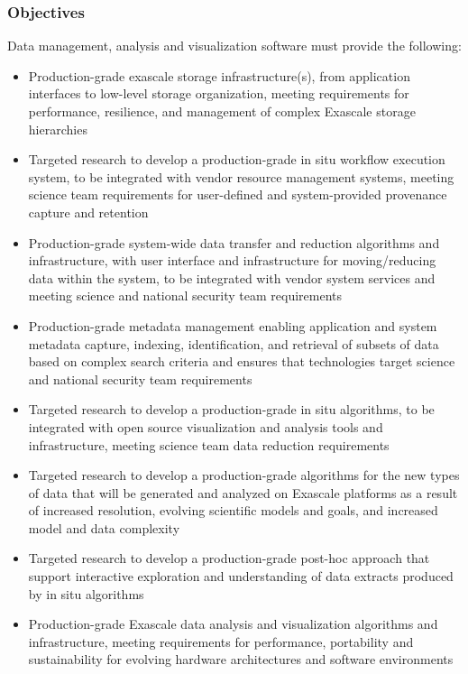 \subsubsection{Objectives}
Data management, analysis and visualization software must provide the following:
\begin{itemize}
\item Production-grade exascale storage infrastructure(s), from application interfaces to low-level storage organization, meeting requirements for performance, resilience, and management of complex Exascale storage hierarchies
\item Targeted research to develop a production-grade in situ workflow execution system, to be integrated with vendor resource management systems, meeting science team requirements for user-defined and system-provided provenance capture and retention
\item Production-grade system-wide data transfer and reduction algorithms and infrastructure, with user interface and infrastructure for moving/reducing data within the system, to be integrated with vendor system services and meeting science and national security team requirements
\item Production-grade metadata management enabling application and system metadata capture, indexing, identification, and retrieval of subsets of data based on complex search criteria and ensures that technologies target science and national security team requirements
\item Targeted research to develop a production-grade in situ algorithms, to be integrated with open source visualization and analysis tools and infrastructure, meeting science team data reduction requirements
\item Targeted research to develop a production-grade algorithms for the new types of data that will be generated and analyzed on Exascale platforms as a result of increased resolution, evolving scientific models and goals, and increased model and data complexity
\item Targeted research to develop a production-grade post-hoc approach that support interactive exploration and understanding of data extracts produced by in situ algorithms
\item Production-grade Exascale data analysis and visualization algorithms and infrastructure, meeting requirements for performance, portability and sustainability for evolving hardware architectures and software environments
\end{itemize}

